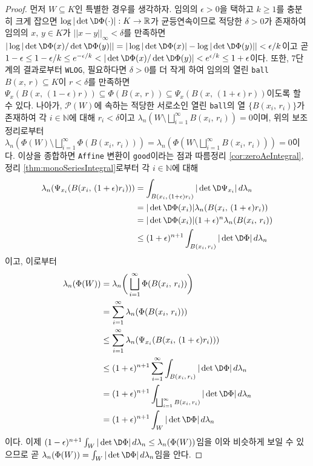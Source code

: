 \begin{proof}
    먼저 $W\subseteq K$인 특별한 경우를 생각하자. 임의의 $\epsilon>0$을 택하고 $k\geq1$를 충분히 크게 잡으면 $\log|\det\D\Phi(\cdot)|:K\to\mathbb{R}$가 균등연속이므로 적당한 $\delta>0$가 존재하여 임의의 $x,\,y\in K$가 $||x-y||_\infty<\delta$를 만족하면 $|\log|\det\D\Phi(x)/\det\D\Phi(y)||=|\log|\det\D\Phi(x)|-\log|\det\D\Phi(y)||<\epsilon/k$이고 곧 $1-\epsilon\leq1-\epsilon/k\leq e^{-\epsilon/k}<|\det\D\Phi(x)/\det\D\Phi(y)|<e^{\epsilon/k}\leq1+\epsilon$이다. 또한, 7단계의 결과로부터 \texttt{WLOG}, 필요하다면 $\delta>0$를 더 작게 하여 임의의 열린 \texttt{ball} $B(x,\,r)\subseteq K$이 $r<\delta$를 만족하면 $\Psi_x(B(x,\,(1-\epsilon)r))\subseteq\Phi(B(x,\,r))\subseteq\Psi_x(B(x,\,(1+\epsilon)r))$이도록 할 수 있다. 나아가, $\mathcal{P}(W)$에 속하는 적당한 서로소인 열린 \texttt{ball}의 열 $\{B(x_i,\,r_i)\}$가 존재하여 각 $i\in\mathbb{N}$에 대해 $r_i<\delta$이고 $\lambda_n(W\setminus\bigsqcup_{i=1}^\infty B(x_i,\,r_i))=0$이며,\footnotemark\label{note:countableBoundaryNull} 위의 보조정리로부터 $\lambda_n(\Phi(W)\setminus\bigsqcup_{i=1}^\infty\Phi(B(x_i,\,r_i)))=\lambda_n(\Phi(W\setminus\bigsqcup_{i=1}^\infty B(x_i,\,r_i)))=0$이다. 이상을 종합하면 \texttt{Affine} 변환이 \texttt{good}이라는 점과 따름정리 \ref{cor:zeroAeIntegral}, 정리 \ref{thm:monoSeriesIntegral}로부터 각 $i\in\mathbb{N}$에 대해
    \begin{align*}
        \lambda_n(\Psi_{x_i}(B(x_i,\,(1+\epsilon)r_i)))&=\int_{B(x_i,\,(1+\epsilon)r_i)}|\det\D\Psi_{x_i}|\,d\lambda_n\\
        &=|\det\D\Phi(x_i)|\lambda_n(B(x_i,\,(1+\epsilon)r_i))\\
        &=|\det\D\Phi(x_i)|(1+\epsilon)^n\lambda_n(B(x_i,\,r_i))\\
        &\leq(1+\epsilon)^{n+1}\int_{B(x_i,\,r_i)}|\det\D\Phi|\,d\lambda_n
    \end{align*}
    이고, 이로부터
    \begin{align*}
        \lambda_n(\Phi(W))&=\lambda_n\bigg(\bigsqcup_{i=1}^\infty\Phi(B(x_i,\,r_i))\bigg)\\
        &=\sum_{i=1}^\infty\lambda_n(\Phi(B(x_i,\,r_i)))\\
        &\leq\sum_{i=1}^\infty\lambda_n(\Psi_{x_i}(B(x_i,\,(1+\epsilon)r_i)))\\
        &\leq(1+\epsilon)^{n+1}\sum_{i=1}^\infty\int_{B(x_i,\,r_i)}|\det\D\Phi|\,d\lambda_n\\
        &=(1+\epsilon)^{n+1}\int_{\bigsqcup_{i=1}^\infty B(x_i,\,r_i)}|\det\D\Phi|\,d\lambda_n\\
        &=(1+\epsilon)^{n+1}\int_W|\det\D\Phi|\,d\lambda_n
    \end{align*}
    이다. 이제 $(1-\epsilon)^{n+1}\int_W|\det\D\Phi|\,d\lambda_n\leq\lambda_n(\Phi(W))$임을 이와 비슷하게 보일 수 있으므로 곧 $\lambda_n(\Phi(W))=\int_W|\det\D\Phi|\,d\lambda_n$임을 안다.


\end{proof}
